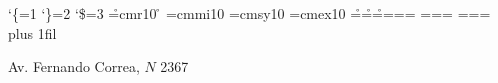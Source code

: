 %
%
%
%
%
%
%
\catcode`\{=1 \catcode`\}=2 \catcode`\$=3
\font\r=cmr10 \r \parindent=0pt
\font\mi=cmmi10 \font\sy=cmsy10 \font\ex=cmex10
=\r {}=\r {}=\r
{}=\mi {}=\mi {}=\mi
{}=\sy {}=\sy {}=\sy
{}=\ex {}=\ex {}=\ex
{} 
\hsize=200pt \rightskip=0pt plus 1fil

Av. Fernando Correa, $N$ \kern2pt 2367\par

